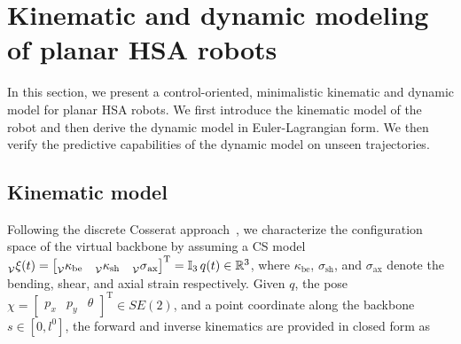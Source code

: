 \section{Kinematic and dynamic modeling of planar HSA robots}\label{sec:hsamodel:planar_hsa_robot_model}
In this section, we present a control-oriented, minimalistic kinematic and dynamic model for planar \gls{HSA} robots. We first introduce the kinematic model of the robot and then derive the dynamic model in Euler-Lagrangian form. We then verify the predictive capabilities of the dynamic model on unseen trajectories.

\subsection{Kinematic model}\label{sub:hsamodel:planar_hsa_robot_model:kinematics}
Following the discrete Cosserat approach~\cite{renda2018discrete}, we characterize the configuration space of the virtual backbone by assuming a \gls{CS} model
$\prescript{}{\mathcal{V}}{\xi}(t) = \begin{bmatrix}\prescript{}{{\mathcal{V}}}{\kappa}_\mathrm{be} & \prescript{}{{\mathcal{V}}}{\kappa}_\mathrm{sh} & \prescript{}{{\mathcal{V}}}{\sigma}_\mathrm{ax}\end{bmatrix}^\mathrm{T} = \mathbb{I}_3 \, q(t) \in \mathbb{R}^3$, where $\kappa_\mathrm{be}$, $\sigma_\mathrm{sh}$, and $\sigma_\mathrm{ax}$ denote the bending, shear, and axial strain respectively.
Given $q$, the pose $\chi = \begin{bmatrix}
    p_x & p_y & \theta
\end{bmatrix}^\mathrm{T} \in SE(2)$, and a point coordinate along the backbone $s \in [0, l^0]$, the forward and inverse kinematics are provided in closed form as
